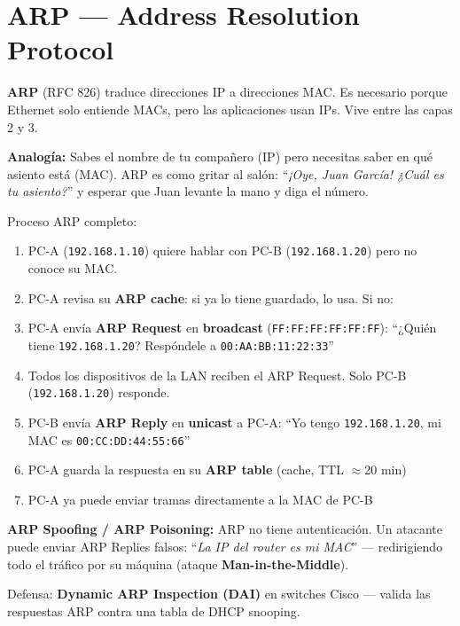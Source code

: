 \section{ ARP --- Address Resolution Protocol}

\begin{concepto}
\textbf{ARP} (RFC 826) traduce direcciones IP a direcciones MAC.
Es necesario porque Ethernet solo entiende MACs, pero las aplicaciones
usan IPs. Vive entre las capas 2 y 3.

 \textbf{Analogía:} Sabes el nombre de tu compañero (IP)
pero necesitas saber en qué asiento está (MAC). ARP es como gritar
al salón: ``\textit{¡Oye, Juan García! ¿Cuál es tu asiento?}''
y esperar que Juan levante la mano y diga el número.
\end{concepto}

Proceso ARP completo:
\begin{enumerate}
    \item PC-A (\texttt{192.168.1.10}) quiere hablar con PC-B (\texttt{192.168.1.20})
          pero no conoce su MAC.
    \item PC-A revisa su \textbf{ARP cache}: si ya lo tiene guardado, lo usa.
          Si no:
    \item PC-A envía \textbf{ARP Request} en \textbf{broadcast}
          (\texttt{FF:FF:FF:FF:FF:FF}):
          ``¿Quién tiene \texttt{192.168.1.20}? Respóndele a \texttt{00:AA:BB:11:22:33}''
    \item Todos los dispositivos de la LAN reciben el ARP Request.
          Solo PC-B (\texttt{192.168.1.20}) responde.
    \item PC-B envía \textbf{ARP Reply} en \textbf{unicast} a PC-A:
          ``Yo tengo \texttt{192.168.1.20}, mi MAC es \texttt{00:CC:DD:44:55:66}''
    \item PC-A guarda la respuesta en su \textbf{ARP table} (cache, TTL $\approx$20 min)
    \item PC-A ya puede enviar tramas directamente a la MAC de PC-B
\end{enumerate}

\begin{cuidado}
\textbf{ARP Spoofing / ARP Poisoning:} ARP no tiene autenticación. Un atacante
puede enviar ARP Replies falsos: ``\textit{La IP del router es mi MAC}'' ---
redirigiendo todo el tráfico por su máquina (ataque \textbf{Man-in-the-Middle}).

Defensa: \textbf{Dynamic ARP Inspection (DAI)} en switches Cisco --- valida
las respuestas ARP contra una tabla de DHCP snooping.
\end{cuidado}

